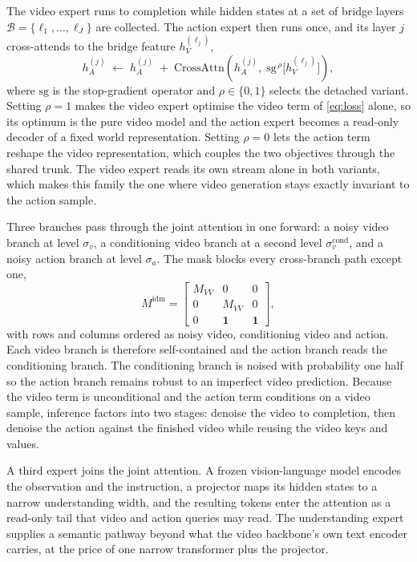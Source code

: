 The video expert runs to completion while hidden states at a set of bridge layers
$\mathcal{B} = \{\ell_1, \dots, \ell_J\}$ are collected. The action expert then
runs once, and its layer $j$ cross-attends to the bridge feature $h_V^{(\ell_j)}$,
\begin{equation}
  h_A^{(j)} \;\leftarrow\; h_A^{(j)} \;+\;
  \mathrm{CrossAttn}\!\left(h_A^{(j)},\; \mathrm{sg}^{\,\rho}\big[h_V^{(\ell_j)}\big]\right),
  \label{eq:bridge}
\end{equation}
where $\mathrm{sg}$ is the stop-gradient operator and $\rho \in \{0, 1\}$ selects
the detached variant. Setting $\rho = 1$ makes the video expert optimise the
video term of \eqref{eq:loss} alone, so its optimum is the pure video model and
the action expert becomes a read-only decoder of a fixed world representation.
Setting $\rho = 0$ lets the action term reshape the video representation, which
couples the two objectives through the shared trunk. The video expert reads its own stream alone in
both variants, which makes this family the one where video generation stays
exactly invariant to the action sample.

Three branches pass through the joint attention in one forward: a noisy video
branch at level $\sigma_v$, a conditioning video branch at a second level
$\sigma_v^{\text{cond}}$, and a noisy action branch at level $\sigma_a$. The mask
blocks every cross-branch path except one,
\begin{equation}
  M^{\text{idm}} =
  \begin{bmatrix}
    M_{VV} & 0 & 0 \\
    0 & M_{VV} & 0 \\
    0 & \mathbf{1} & \mathbf{1}
  \end{bmatrix},
  \label{eq:idmmask}
\end{equation}
with rows and columns ordered as noisy video, conditioning video and action. Each
video branch is therefore self-contained and the action branch reads the
conditioning branch. The conditioning branch is noised with probability one half
so the action branch remains robust to an imperfect video prediction. Because the
video term is unconditional and the action term conditions on a video sample,
inference factors into two stages: denoise the video to completion, then denoise
the action against the finished video while reusing the video keys and values.

A third expert joins the joint attention. A frozen vision-language model
\citep{bai2025qwen25vl} encodes the observation and the instruction, a projector
maps its hidden states to a narrow understanding width, and the resulting tokens
enter the attention as a read-only tail that video and action queries may read.
The understanding expert supplies a semantic pathway beyond what the video
backbone's own text encoder carries, at the price of one narrow transformer plus
the projector.

